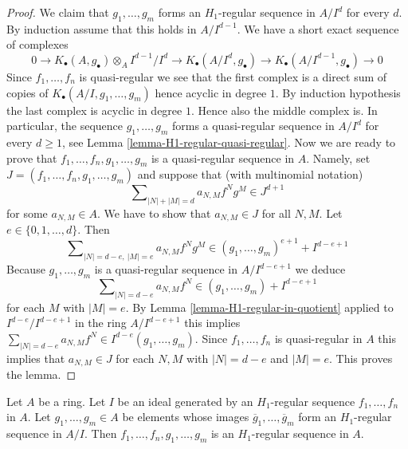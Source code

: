 \begin{proof}
We claim that $g_1, \ldots, g_m$ forms an $H_1$-regular sequence in
$A/I^d$ for every $d$. By induction assume that this holds in
$A/I^{d - 1}$. We have a short exact sequence of complexes
$$
0 \to K_\bullet(A, g_\bullet) \otimes_A I^{d - 1}/I^d
\to K_\bullet(A/I^d, g_\bullet) \to
K_\bullet(A/I^{d - 1}, g_\bullet) \to 0
$$
Since $f_1, \ldots, f_n$ is quasi-regular we see that the first complex
is a direct sum of copies of $K_\bullet(A/I, g_1, \ldots, g_m)$
hence acyclic in degree $1$. By induction hypothesis the last complex is
acyclic in degree $1$. Hence also the middle complex is.
In particular, the sequence $g_1, \ldots, g_m$ forms a quasi-regular
sequence in $A/I^d$ for every $d \geq 1$, see
Lemma \ref{lemma-H1-regular-quasi-regular}.
Now we are ready to prove that $f_1, \ldots, f_n, g_1, \ldots, g_m$
is a quasi-regular sequence in $A$.
Namely, set $J = (f_1, \ldots, f_n, g_1, \ldots, g_m)$ and suppose
that (with multinomial notation)
$$
\sum\nolimits_{|N| + |M| = d} a_{N, M} f^N g^M \in J^{d + 1}
$$
for some $a_{N, M} \in A$. We have to show that $a_{N, M} \in J$
for all $N, M$. Let $e \in \{0, 1, \ldots, d\}$. Then
$$
\sum\nolimits_{|N| = d - e, \ |M| = e} a_{N, M} f^N g^M \in
(g_1, \ldots, g_m)^{e + 1} + I^{d - e + 1}
$$
Because $g_1, \ldots, g_m$ is a quasi-regular sequence in $A/I^{d - e + 1}$
we deduce
$$
\sum\nolimits_{|N| = d - e} a_{N, M} f^N \in
(g_1, \ldots, g_m) + I^{d - e + 1}
$$
for each $M$ with $|M| = e$. By
Lemma \ref{lemma-H1-regular-in-quotient}
applied to $I^{d - e}/I^{d - e + 1}$ in the ring $A/I^{d - e + 1}$
this implies $\sum_{|N| = d - e} a_{N, M} f^N \in I^{d - e}(g_1, \ldots, g_m)$.
Since $f_1, \ldots, f_n$ is quasi-regular in $A$ this implies
that $a_{N, M} \in J$ for each $N, M$ with $|N| = d - e$ and $|M| = e$.
This proves the lemma.
\end{proof}

\begin{lemma}
\label{lemma-join-H1-regular-sequences}
Let $A$ be a ring. Let $I$ be an ideal generated by an
$H_1$-regular sequence $f_1, \ldots, f_n$ in $A$.
Let $g_1, \ldots, g_m \in A$ be elements whose images
$\overline{g}_1, \ldots, \overline{g}_m$ form an $H_1$-regular sequence
in $A/I$. Then $f_1, \ldots, f_n, g_1, \ldots, g_m$ is an $H_1$-regular
sequence in $A$.
\end{lemma}

